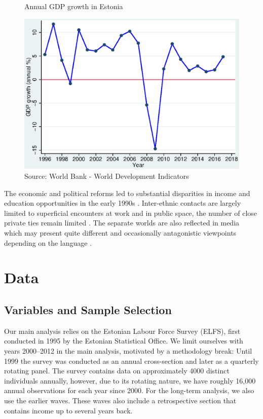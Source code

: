 \documentclass[12pt, a4paper]{article}
\begin{document}
\begin{figure}[h]
 \centering           
 \caption{Annual GDP growth in Estonia}\label{fig:gdp_growth}
 \includegraphics[width=0.6\linewidth]{Figure1.eps}
 \caption*{Source: World Bank - World Development Indicators}
\end{figure}

The economic and political reforms led to substantial
disparities in income and education opportunities
in the early 1990s \citep{Leping2008,
	lindemann+saar2011Russian2ndGeneration}. Inter-ethnic contacts
are largely limited to superficial encounters at work and in public
space, the number of close private ties remain limited
\citep{korts2009JofBaltStud}. The
separate worlds are also reflected in media which may present quite
different and occasionally antagonistic viewpoints depending on the
language \citep{Korts2002}.


\section{Data}
\label{subsec:ss_var}

\subsection{Variables and Sample Selection}
\label{sec:variables}

Our main analysis relies on the Estonian Labour Force Survey (ELFS),
first conducted in 1995 by the Estonian Statistical Office. We limit
ourselves with years 2000--2012 in the main analysis, motivated by a
methodology break: Until 1999 the survey was conducted as an annual
cross-section and later as a quarterly rotating panel. The survey
contains data on approximately 4000 distinct individuals annually,
however, due to its rotating nature, we have roughly 16,000 annual
observations for each year since 2000. For the long-term analysis, we
also use the earlier waves. These waves also include a retrospective
section that contains income up to several years back.
\end{document}
